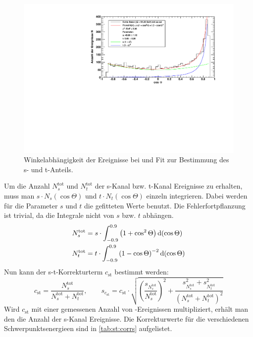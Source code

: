 \begin{figure}[H]
\begin{center}
  \includegraphics[width=\textwidth]{../img/s_t_fit_91-23.pdf}
  \caption{Winkelabhängigkeit der Ereignisse bei  und Fit zur Bestimmung des s- und t-Anteils.}
  \label{img:st:9123}
\end{center}
\end{figure}
Um die Anzahl $N_s^\text{tot}$ und $N_t^\text{tot}$ der s-Kanal bzw. t-Kanal Ereignisse zu erhalten, muss man 
$s \cdot N_s(\cos \Theta)$ und $t \cdot N_t(\cos \Theta)$ einzeln integrieren. Dabei werden für die Parameter $s$ und $t$ die 
gefitteten Werte benutzt. Die Fehlerfortpflanzung ist trivial, da die Integrale nicht von $s$ bzw. $t$ abhängen.
\begin{equation}
    \begin{split}
        & N_s^\text{tot} = s \cdot \int_{-0.9}^{0.9} \left( 1 + \cos^2 \Theta \right) \mathrm{d} (\cos \Theta) \\
        & N_t^\text{tot} = t \cdot \int_{-0.9}^{0.9} \left( 1 - \cos \Theta \right)^{-2} \mathrm{d} (\cos \Theta)
    \end{split}
\end{equation}
Nun kann der s-t-Korrekturterm $c_{\text{st}}$ bestimmt werden:
\begin{equation}
    c_{\text{st}} = \frac{N_s^\text{tot}}{N_s^\text{tot} + N_t^\text{tot}}, \qquad 
    s_{c_{\text{st}}} = c_{\text{st}} \cdot \sqrt{ \left( \frac{s_{N_s^\text{tot}}}{N_s^\text{tot}} \right)^2 + 
    \frac{s_{N_s^\text{tot}}^2 + s_{N_t^\text{tot}}^2}{ \left( N_s^\text{tot} + N_t^\text{tot} \right)^2 } }
\end{equation}
Wird $c_{\text{st}}$ mit einer gemessenen Anzahl von \ee -Ereignissen multipliziert, erhält man den die Anzahl der s-Kanal Ereignisse.
Die Korrekturwerte für die verschiedenen Schwerpunktsenergieen sind in \autoref{tab:st:corrs} aufgelistet.


